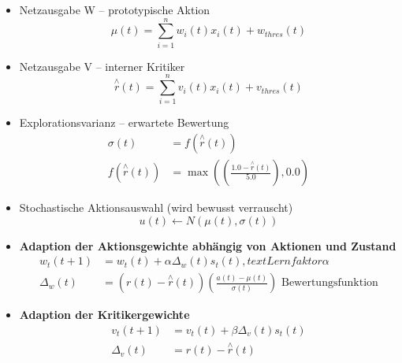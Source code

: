 \begin{itemize}
	\item Netzausgabe W -- prototypische Aktion
	\begin{equation*}
		\mu(t) = \sum_{i = 1}^{n} w_i(t) x_i(t) + w_{thres}(t)
	\end{equation*}
	\item Netzausgabe V -- interner Kritiker
	\begin{equation*}
		\overset{\wedge}{r}(t) = \sum_{i = 1}^{n} v_i(t) x_i(t) + v_{thres}(t)
	\end{equation*}
	\item Explorationsvarianz -- erwartete Bewertung
	\begin{align*}
		\sigma(t) &= f(\overset{\wedge}{r}(t)) \\
		f(\overset{\wedge}{r}(t)) &= \max \left(\left( \frac{1.0 - \overset{\wedge}{r}(t)}{5.0}\right), 0.0\right)
	\end{align*}
	\item Stochastische Aktionsauswahl (wird bewusst verrauscht)
	\begin{equation*}
		u(t) \leftarrow N (\mu (t), \sigma (t))
	\end{equation*}
	\item \textbf{Adaption der Aktionsgewichte abhängig von Aktionen und Zustand}
	\begin{align*}
		w_t(t+1) &= w_t(t) + \alpha \Delta_w (t) s_t (t), text{ Lernfaktor }\alpha\\ 
		\Delta_w(t) &= \left(r(t) - \overset{\wedge}{r}(t)\right)\left(\frac{a(t) - \mu (t)}{\sigma (t)}\right) \text{ Bewertungsfunktion}
	\end{align*}
	\item \textbf{Adaption der Kritikergewichte}
	\begin{align*}
		v_t(t+1) &= v_t(t) + \beta \Delta_v (t) s_t(t) \\
		\Delta_v(t) &= r(t) - \overset{\wedge}{r}(t)
	\end{align*}
\end{itemize}

